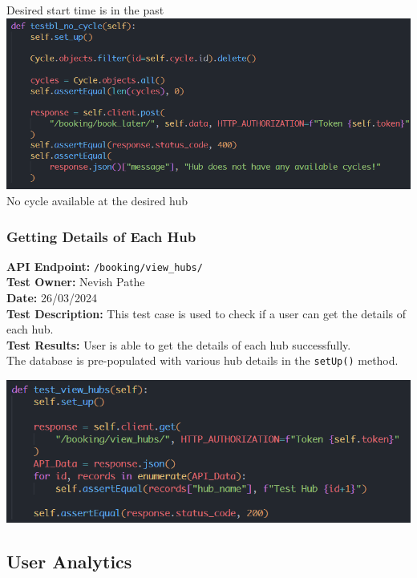\documentclass[11pt]{article}
\begin{document}
\begin{center}
    Desired start time is in the past\\
    \includegraphics[scale=0.6]{unit_testing_codes/book_later_6.png}\\
    No cycle available at the desired hub\\
\end{center}

\subsubsection{Getting Details of Each Hub}
\textbf{API Endpoint: } \texttt{/booking/view\_hubs/} \\
\textbf{Test Owner: } Nevish Pathe \\
\textbf{Date: } 26/03/2024 \\
\textbf{Test Description: } This test case is used to check if a user can get the details of each hub. \\
\textbf{Test Results: } User is able to get the details of each hub successfully.\\
The database is pre-populated with various hub details in the \texttt{setUp()} method.

\begin{center}
    \includegraphics[scale=0.7]{unit_testing_codes/view_hubs.png}
\end{center}

\subsection{User Analytics}
\end{document}
